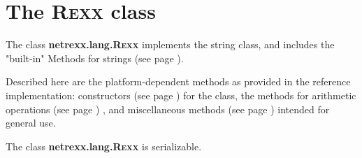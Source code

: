 \section{The R\textsc{exx} class}\label{refnlrexx}
 
The class \textbf{netrexx.lang.R\textsc{exx}} implements the \nr{} string
class, and includes the "built-in"  Methods for \nr{} strings (see page \pageref{refbmeth}).

 
Described here are the platform-dependent methods as provided in
the reference implementation:  constructors (see page \pageref{refrexxcon})  for the
class, the methods for  arithmetic operations (see page \pageref{refrexxops}) , and
 miscellaneous methods (see page \pageref{refrexxmis})  intended for general
use.
 
The class \textbf{netrexx.lang.R\textsc{exx}} is serializable.
